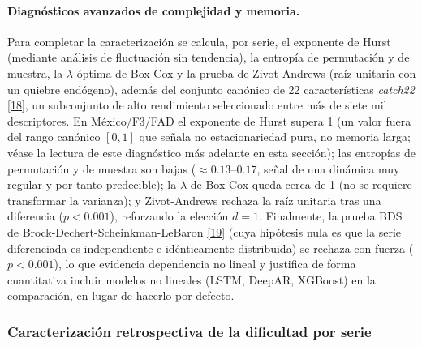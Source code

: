 \documentclass[12pt,letterpaper]{report}
\newcommand{\cita}[1]{\hyperref[bib:#1]{[#1]}}
\begin{document}
\paragraph{Diagnósticos avanzados de complejidad y memoria.} Para completar la
caracterización se calcula, por serie, el exponente de Hurst (mediante análisis de
fluctuación sin tendencia), la entropía de permutación y de muestra, la $\lambda$
óptima de Box-Cox y la prueba de Zivot-Andrews (raíz unitaria con un quiebre endógeno),
además del conjunto canónico de 22 características \textit{catch22} \cita{18}, un
subconjunto de alto rendimiento seleccionado entre más de siete mil descriptores. En
México/F3/FAD el exponente de Hurst supera 1 (un valor fuera del rango canónico $[0,1]$ que
señala no estacionariedad pura, no memoria larga; véase la lectura de este diagnóstico más
adelante en esta sección);
las entropías de permutación y de muestra son bajas ($\approx 0.13$--$0.17$, señal de
una dinámica muy regular y por tanto predecible); la $\lambda$ de Box-Cox queda cerca
de 1 (no se requiere transformar la varianza); y Zivot-Andrews rechaza la raíz unitaria
tras una diferencia ($p < 0.001$), reforzando la elección $d=1$. Finalmente, la prueba
BDS de Brock-Dechert-Scheinkman-LeBaron \cita{19} (cuya hipótesis nula es que la serie
diferenciada es independiente e idénticamente distribuida) se rechaza con fuerza
($p < 0.001$), lo que evidencia dependencia no lineal y justifica de forma cuantitativa
incluir modelos no lineales (LSTM, DeepAR, XGBoost) en la comparación, en lugar de
hacerlo por defecto.

\subsubsection{Caracterización retrospectiva de la dificultad por serie}
\end{document}
